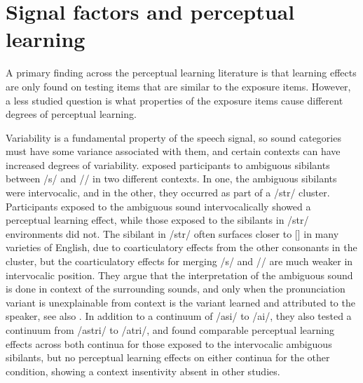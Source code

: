 \section{Signal factors and perceptual learning}
\label{sec:signal}

A primary finding across the perceptual learning literature is that learning effects are only found on testing items that are similar to the exposure items.  However, a less studied question is what properties of the exposure items cause different degrees of perceptual learning.  

Variability is a fundamental property of the speech signal, so sound categories must have some variance associated with them, and certain contexts can have increased degrees of variability.
\citet{Kraljic2008a} exposed participants to ambiguous sibilants between /s/ and /\textesh/ in two different contexts.  
In one, the ambiguous sibilants were intervocalic, and in the other, they occurred as part of a /str/ cluster.  
Participants exposed to the ambiguous sound intervocalically showed a perceptual learning effect, while those exposed to the sibilants in /str/ environments did not.  
The sibilant in /str/ often surfaces closer to [\textesh] in many varieties of English, due to coarticulatory effects from the other consonants in the cluster, but the coarticulatory effects for merging /s/ and /\textesh/ are much weaker in intervocalic position.  
They argue that the interpretation of the ambiguous sound is done in context of the surrounding sounds, and only when the pronunciation variant is unexplainable from context is the variant learned and attributed to the speaker, see also \citet{Kraljic2008}.  
In addition to a continuum of /asi/ to /a\textesh i/, they also tested a continuum from /astri/ to /a\textesh tri/, and found comparable perceptual learning effects across both continua for those exposed to the intervocalic ambiguous sibilants, but no perceptual learning effects on either continua for the other condition, showing a context insentivity absent in other studies.


